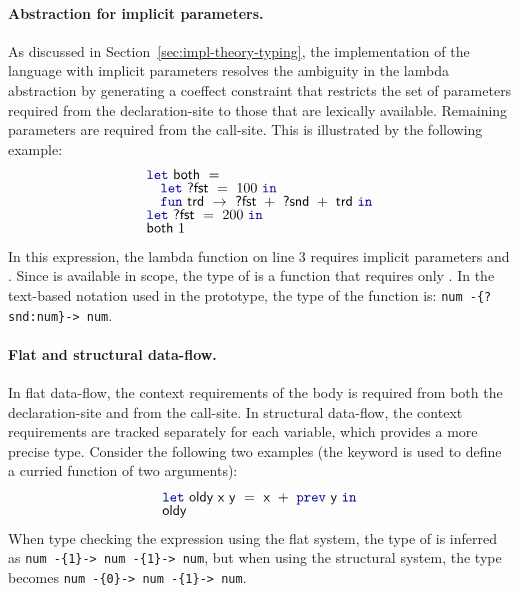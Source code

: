\paragraph{Abstraction for implicit parameters.}
As discussed in Section~\ref{sec:impl-theory-typing}, the implementation of the language with
implicit parameters resolves the ambiguity in the lambda abstraction by generating a coeffect
constraint that restricts the set of parameters required from the declaration-site to those that
are lexically available. Remaining parameters are required from the call-site. This is illustrated
by the following example:
%
\begin{equation*}
\begin{array}{l}
\kvd{let}~\ident{both}~=\\[-0.25em]
\quad \kvd{let}~\ident{?fst}~=~100~\kvd{in}\\[-0.25em]
\quad \kvd{fun}~\ident{trd}~\rightarrow~\ident{?fst}~+~\ident{?snd}~+~\ident{trd}~\kvd{in}\\[-0.25em]
\kvd{let}~\ident{?fst}~=~200~\kvd{in}\\[-0.25em]
\ident{both}~1
\end{array}
\end{equation*}
%
In this expression, the lambda function on line 3 requires implicit parameters  and
. Since  is available in scope, the type of  is a function that
requires only . In the text-based notation used in the prototype, the type of the
function  is: {\tt num -\{?snd:num\}-> num}.

\paragraph{Flat and structural data-flow.}
In flat data-flow, the context requirements of the body is required from both the declaration-site
and from the call-site. In structural data-flow, the context requirements are tracked separately
for each variable, which provides a more precise type. Consider the following two examples (the
 keyword is used to define a curried function of two arguments):
%
\begin{equation*}
\begin{array}{l}
\kvd{let}~\ident{oldy}~\ident{x}~\ident{y}~=~\ident{x}~+~\kvd{prev}~\ident{y}~\kvd{in}\\[-0.25em]
\ident{oldy}
\end{array}
\end{equation*}
%
When type checking the expression using the flat system, the type of  is inferred as {\tt num -\{1\}-> num -\{1\}-> num},
but when using the structural system, the type becomes {\tt num -\{0\}-> num -\{1\}-> num}.

